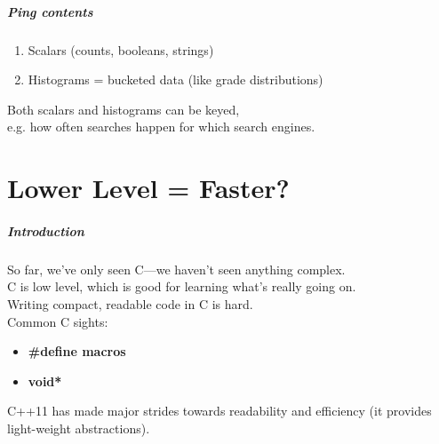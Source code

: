 \begin{frame}
\frametitle{Ping contents}
\Large

\begin{enumerate}
\item Scalars (counts, booleans, strings)
\item Histograms = bucketed data (like grade distributions)
\end{enumerate}

Both scalars and histograms can be keyed, \\
e.g. how often searches happen for which search engines.
\end{frame}

\part{Lower Level = Faster?}

\begin{frame}
\partpage
\end{frame}

\begin{frame}
  \frametitle{Introduction}

  
    So far, we've only seen C---we haven't seen anything 
      complex.\\[1em]

    C is low level, which is good for learning what's
    really going on.\\[2em]

    Writing compact, readable code in C is hard. \\ Common C sights:
      \begin{itemize}
        \item {\bf \#define macros}
        \item {\bf void*}
      \end{itemize}
    C++11 has made major strides towards readability and efficiency
      (it provides light-weight abstractions).
  
\end{frame}


